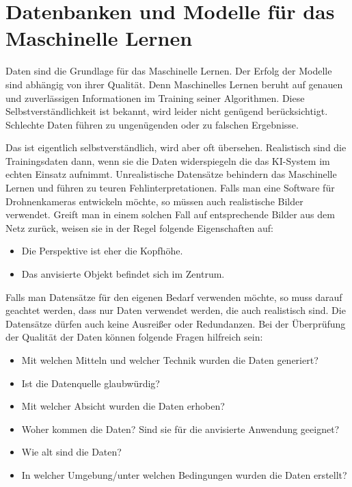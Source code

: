 {

\chapter{Datenbanken und Modelle für das Maschinelle Lernen}

Daten sind die Grundlage für das Maschinelle Lernen. Der Erfolg der Modelle sind abhängig von ihrer Qualität. Denn Maschinelles Lernen beruht auf genauen und zuverlässigen Informationen im Training seiner Algorithmen. Diese Selbstverständlichkeit ist bekannt, wird leider nicht genügend berücksichtigt. Schlechte Daten führen zu ungenügenden  oder zu falschen Ergebnisse.  

Das ist eigentlich selbstverständlich, wird aber oft übersehen. Realistisch sind die Trainingsdaten dann, wenn sie die Daten widerspiegeln die das KI-System im echten Einsatz aufnimmt. Unrealistische Datensätze behindern das Maschinelle Lernen und führen zu teuren Fehlinterpretationen. Falls man eine Software für Drohnenkameras entwickeln möchte, so müssen auch realistische Bilder verwendet. Greift man in einem solchen Fall auf entsprechende Bilder aus dem Netz zurück, weisen sie in der Regel folgende Eigenschaften auf:

\begin{itemize}
  \item Die Perspektive ist eher die Kopfhöhe.
  \item Das anvisierte Objekt befindet sich im Zentrum.
\end{itemize}

Falls man Datensätze für den eigenen Bedarf verwenden möchte, so muss darauf geachtet werden, dass nur Daten verwendet werden, die auch realistisch sind. Die Datensätze dürfen auch keine Ausreißer oder Redundanzen.  Bei der Überprüfung der Qualität der Daten können folgende Fragen hilfreich sein:


\begin{itemize}
  \item Mit welchen Mitteln und welcher Technik wurden die Daten generiert?
  \item Ist die Datenquelle glaubwürdig?
  \item Mit welcher Absicht wurden die Daten erhoben?
  \item Woher kommen die Daten? Sind sie für die anvisierte Anwendung geeignet?
  \item Wie alt sind die Daten?
  \item In welcher Umgebung/unter welchen Bedingungen wurden die Daten erstellt?
\end{itemize}

}
